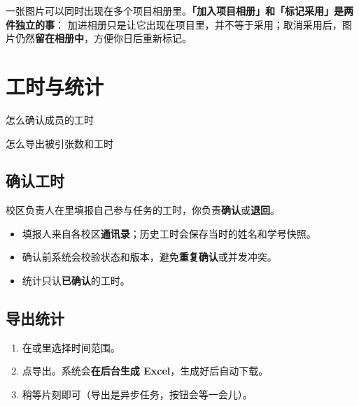 \documentclass[cn,11pt,green]{elegantbook}
\begin{document}
\begin{notebox}[一张图可以属于多个项目]
  一张图片可以同时出现在多个项目相册里。\textbf{「加入项目相册」和「标记采用」是两件独立的事}：
  加进相册只是让它出现在项目里，并不等于采用；取消采用后，图片仍然\textbf{留在相册中}，方便你日后重新标记。
\end{notebox}

\chapter{工时与统计}

\begin{introduction}
  \item 怎么确认成员的工时
  \item 怎么导出被引张数和工时
\end{introduction}

\section{确认工时}

校区负责人在里填报自己参与任务的工时，你负责\textbf{确认}或\textbf{退回}。

\begin{itemize}
  \item 填报人来自各校区\textbf{通讯录}；历史工时会保存当时的姓名和学号快照。
  \item 确认前系统会校验状态和版本，避免\textbf{重复确认}或并发冲突。
  \item 统计只认\textbf{已确认}的工时。
\end{itemize}

\section{导出统计}

\begin{stepbox}[导出成员数据]
  \begin{enumerate}
    \item 在或里选择时间范围。
    \item 点导出。系统会\textbf{在后台生成 Excel}，生成好后自动下载。
    \item 稍等片刻即可（导出是异步任务，按钮会等一会儿）。
  \end{enumerate}
\end{stepbox}
\end{document}
